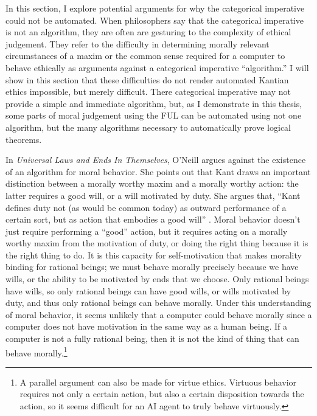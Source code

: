 \begin{isabellebody}
\begin{isamarkuptext}
In this section, I explore potential arguments for why the categorical imperative could not be automated. When 
philosophers say that the categorical imperative is not an algorithm, they are often are gesturing to the complexity
of ethical judgement. They refer to the difficulty in determining morally relevant circumstances of a maxim or the common 
sense required for a computer to behave ethically as arguments against a categorical imperative ``algorithm.'' 
I will show in this section that these difficulties do not render automated Kantian ethics impossible, but 
merely difficult. There categorical imperative may not provide a simple and immediate algorithm, but, as
I demonstrate in this thesis, some parts of moral judgement using the FUL can be automated using not one
algorithm, but the many algorithms necessary to automatically prove logical theorems.

In \emph{Universal Laws and Ends In Themselves}, O'Neill argues against the existence of an algorithm for
moral behavior. She points out that Kant draws an important distinction between a morally worthy maxim
and a morally worthy action: the latter requires a good will, or a will motivated by duty. She argues that, 
``Kant defines duty not (as would be common today) as outward performance of a certain sort, but as action
that embodies a good will'' \citep[345]{oneilluniversallaws}. Moral behavior doesn't just require performing
a ``good'' action, but it requires acting on a morally worthy maxim from the motivation of duty, or 
doing the right thing because it is the right thing to do. It is this capacity 
for self-motivation that makes morality binding for rational beings; we must behave morally precisely 
because we have wills, or the ability to be motivated by ends
that we choose. Only rational beings have wills, so only rational beings can have good wills, or wills
motivated by duty, and thus only rational beings can behave morally. Under this understanding
of moral behavior, it seems unlikely that a computer could behave morally
since a computer does not have motivation in the same way as a human being. If a computer is not a fully rational
being, then it is not the kind of thing that can behave morally.\footnote{A parallel argument can also be made for virtue ethics. Virtuous
behavior requires not only a certain action, but also a certain disposition towards the action, so it seems
difficult for an AI agent to truly behave virtuously.}


\end{isamarkuptext}
\end{isabellebody}
